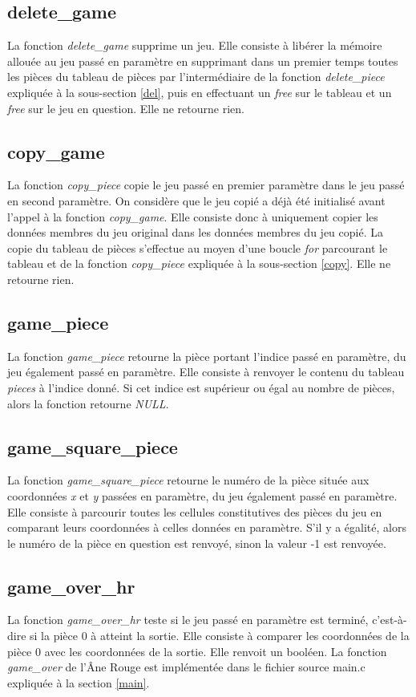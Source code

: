 \documentclass{report}
\begin{document}
\subsection{delete\_game}
La fonction \emph{delete\_game} supprime un jeu. Elle consiste à libérer la mémoire allouée au jeu passé en paramètre en supprimant dans un premier temps toutes les pièces du tableau de pièces par l'intermédiaire de la fonction \emph{delete\_piece} expliquée à la sous-section \ref{del}, puis en effectuant un \emph{free} sur le tableau et un \emph{free} sur le jeu en question. Elle ne retourne rien.
\subsection{copy\_game}
La fonction \emph{copy\_piece} copie le jeu passé en premier paramètre dans le jeu passé en second paramètre. On considère que le jeu copié a déjà été initialisé avant l'appel à la fonction \emph{copy\_game}. Elle consiste donc à uniquement copier les données membres du jeu original dans les données membres du jeu copié. La copie du tableau de pièces s'effectue au moyen d'une boucle \emph{for} parcourant le tableau et de la fonction \emph{copy\_piece} expliquée à la sous-section \ref{copy}. Elle ne retourne rien.
\subsection{game\_piece}
La fonction \emph{game\_piece} retourne la pièce portant l'indice passé en paramètre, du jeu également passé en paramètre. Elle consiste à renvoyer le contenu du tableau \emph{pieces} à l'indice donné. Si cet indice est supérieur ou égal au nombre de pièces, alors la fonction retourne \emph{NULL}.
\subsection{game\_square\_piece}
La fonction \emph{game\_square\_piece} retourne le numéro de la pièce située aux coordonnées \emph{x} et \emph{y} passées en paramètre, du jeu également passé en paramètre. Elle consiste à parcourir toutes les cellules constitutives des pièces du jeu en comparant leurs coordonnées à celles données en paramètre. S'il y a égalité, alors le numéro de la pièce en question est renvoyé, sinon la valeur -1 est renvoyée.
\subsection{game\_over\_hr}
La fonction \emph{game\_over\_hr} teste si le jeu passé en paramètre est terminé, c'est-à-dire si la pièce 0 à atteint la sortie. Elle consiste à comparer les coordonnées de la pièce 0 avec les coordonnées de la sortie. Elle renvoit un booléen. La fonction \emph{game\_over} de l'Âne Rouge est implémentée dans le fichier source main.c expliquée à la section \ref{main}.
\end{document}
